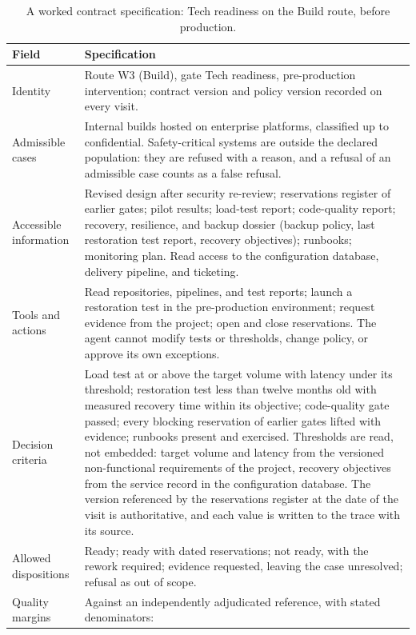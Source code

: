 \begin{table}[!htb]
\centering\footnotesize\renewcommand{\arraystretch}{1.15}
\caption{A worked contract specification: Tech readiness on the Build route, before production.}
\label{tab:contract}
\begin{tabularx}{\linewidth}{@{}P{3.2cm}L@{}}
\toprule
Field & Specification\\
\midrule
Identity & Route W3 (Build), gate Tech readiness, pre-production intervention; contract version and
policy version recorded on every visit.\\
Admissible cases & Internal builds hosted on enterprise platforms, classified up to confidential.
Safety-critical systems are outside the declared population: they are refused with a reason, and a
refusal of an admissible case counts as a false refusal.\\
Accessible information & Revised design after security re-review; reservations register of earlier
gates; pilot results; load-test report; code-quality report; recovery, resilience, and backup dossier
(backup policy, last restoration test report, recovery objectives); runbooks; monitoring plan. Read
access to the configuration database, delivery pipeline, and ticketing.\\
Tools and actions & Read repositories, pipelines, and test reports; launch a restoration test in the
pre-production environment; request evidence from the project; open and close reservations. The agent
cannot modify tests or thresholds, change policy, or approve its own exceptions.\\
Decision criteria & Load test at or above the target volume with latency under its threshold;
restoration test less than twelve months old with measured recovery time within its objective;
code-quality gate passed; every blocking reservation of earlier gates lifted with evidence; runbooks
present and exercised. Thresholds are read, not embedded: target volume and latency from the versioned
non-functional requirements of the project, recovery objectives from the service record in the
configuration database. The version referenced by the reservations register at the date of the visit
is authoritative, and each value is written to the trace with its source.\\
Allowed dispositions & Ready; ready with dated reservations; not ready, with the rework required;
evidence requested, leaving the case unresolved; refusal as out of scope.\\
Quality margins & Against an independently adjudicated reference, with stated denominators:

\end{tabularx}
\end{table}

